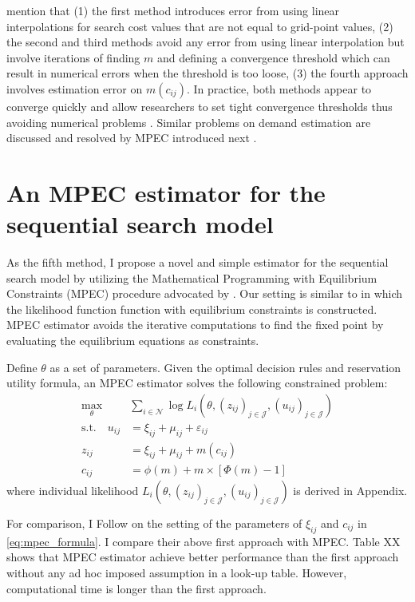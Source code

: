 \documentclass[12pt]{article}
\begin{document}
\cite{ursu2023sequential} mention that (1) the first method introduces error from using linear interpolations for search cost
values that are not equal to grid-point values, (2) the second and third methods avoid any error from using linear interpolation but involve iterations of finding $m$ and defining a convergence threshold which can result in numerical errors when the threshold is too loose, (3) the fourth approach involves estimation error on $m(c_{ij})$. 
In practice, both methods appear to converge quickly and allow researchers to set tight convergence thresholds thus avoiding numerical problems \citep{ursu2023sequential}. 
Similar problems on demand estimation are discussed and resolved by MPEC introduced next \citep{dube2012improving}. 



\section{An MPEC estimator for the sequential search model}
As the fifth method, I propose a novel and simple estimator for the sequential search model by utilizing
the Mathematical Programming with Equilibrium Constraints (MPEC) procedure advocated
by \cite{su2012constrained}. 
Our setting is similar to \cite{su2012constrained} in which the likelihood function
function with equilibrium constraints is constructed. 
MPEC estimator avoids the iterative computations to find the fixed point by evaluating the equilibrium equations as constraints.

Define $\theta$ as a set of parameters.
Given the optimal decision rules and reservation utility formula, an MPEC estimator solves the following constrained problem:
\begin{align}
    \max_{\theta}& \sum_{i\in \mathcal{N}} \log L_{i}(\theta,(z_{ij})_{j\in \mathcal{J}},(u_{ij})_{j\in \mathcal{J}})\nonumber\\
    \text{s.t.}\quad u_{i j} & =\xi_{i j}+\mu_{i j}+\varepsilon_{i j}\label{eq:mpec_formula}\\
    z_{i j}&=\xi_{i j}+\mu_{i j}+m\left(c_{i j}\right) \nonumber\\
    c_{i j}&=\phi(m)+m \times[\Phi(m)-1] \nonumber
\end{align}
where individual likelihood $L_{i}(\theta,(z_{ij})_{j\in \mathcal{J}},(u_{ij})_{j\in \mathcal{J}})$ is derived in Appendix.

For comparison, I Follow \cite{ursu2023sequential} on the setting of the parameters of $\xi_{ij}$ and $c_{ij}$ in \eqref{eq:mpec_formula}. I compare their above first approach with MPEC. Table XX shows that MPEC estimator achieve better performance than the first approach without any ad hoc imposed assumption in a look-up table. However, computational time is longer than the first approach.
\end{document}
